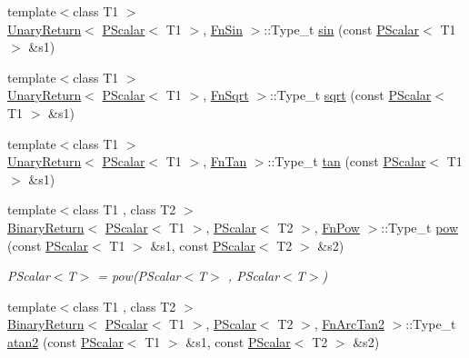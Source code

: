 \begin{DoxyCompactItemize}
\item 
{\footnotesize template$<$class T1 $>$ }\\\mbox{\hyperlink{structENSEM_1_1UnaryReturn}{Unary\+Return}}$<$ \mbox{\hyperlink{classENSEM_1_1PScalar}{P\+Scalar}}$<$ T1 $>$, \mbox{\hyperlink{structENSEM_1_1FnSin}{Fn\+Sin}} $>$\+::Type\+\_\+t \mbox{\hyperlink{group__primscalar_gaa9443eab6edf0a2d0c707614f108a8e3}{sin}} (const \mbox{\hyperlink{classENSEM_1_1PScalar}{P\+Scalar}}$<$ T1 $>$ \&s1)
\item 
{\footnotesize template$<$class T1 $>$ }\\\mbox{\hyperlink{structENSEM_1_1UnaryReturn}{Unary\+Return}}$<$ \mbox{\hyperlink{classENSEM_1_1PScalar}{P\+Scalar}}$<$ T1 $>$, \mbox{\hyperlink{structENSEM_1_1FnSqrt}{Fn\+Sqrt}} $>$\+::Type\+\_\+t \mbox{\hyperlink{group__primscalar_ga07f86503a0138d56e1948dd554ec3e10}{sqrt}} (const \mbox{\hyperlink{classENSEM_1_1PScalar}{P\+Scalar}}$<$ T1 $>$ \&s1)
\item 
{\footnotesize template$<$class T1 $>$ }\\\mbox{\hyperlink{structENSEM_1_1UnaryReturn}{Unary\+Return}}$<$ \mbox{\hyperlink{classENSEM_1_1PScalar}{P\+Scalar}}$<$ T1 $>$, \mbox{\hyperlink{structENSEM_1_1FnTan}{Fn\+Tan}} $>$\+::Type\+\_\+t \mbox{\hyperlink{group__primscalar_gac184e021b0af3d450c4db8f1a8fd75dc}{tan}} (const \mbox{\hyperlink{classENSEM_1_1PScalar}{P\+Scalar}}$<$ T1 $>$ \&s1)
\item 
{\footnotesize template$<$class T1 , class T2 $>$ }\\\mbox{\hyperlink{structENSEM_1_1BinaryReturn}{Binary\+Return}}$<$ \mbox{\hyperlink{classENSEM_1_1PScalar}{P\+Scalar}}$<$ T1 $>$, \mbox{\hyperlink{classENSEM_1_1PScalar}{P\+Scalar}}$<$ T2 $>$, \mbox{\hyperlink{structENSEM_1_1FnPow}{Fn\+Pow}} $>$\+::Type\+\_\+t \mbox{\hyperlink{group__primscalar_ga28323c8753f21f37983319d38eea45ee}{pow}} (const \mbox{\hyperlink{classENSEM_1_1PScalar}{P\+Scalar}}$<$ T1 $>$ \&s1, const \mbox{\hyperlink{classENSEM_1_1PScalar}{P\+Scalar}}$<$ T2 $>$ \&s2)
\begin{DoxyCompactList}\small\item\em P\+Scalar$<$\+T$>$ = pow(\+P\+Scalar$<$\+T$>$ , P\+Scalar$<$\+T$>$) \end{DoxyCompactList}\item 
{\footnotesize template$<$class T1 , class T2 $>$ }\\\mbox{\hyperlink{structENSEM_1_1BinaryReturn}{Binary\+Return}}$<$ \mbox{\hyperlink{classENSEM_1_1PScalar}{P\+Scalar}}$<$ T1 $>$, \mbox{\hyperlink{classENSEM_1_1PScalar}{P\+Scalar}}$<$ T2 $>$, \mbox{\hyperlink{structENSEM_1_1FnArcTan2}{Fn\+Arc\+Tan2}} $>$\+::Type\+\_\+t \mbox{\hyperlink{group__primscalar_gac0968ffacdebb29c939e8bfbfc391fd0}{atan2}} (const \mbox{\hyperlink{classENSEM_1_1PScalar}{P\+Scalar}}$<$ T1 $>$ \&s1, const \mbox{\hyperlink{classENSEM_1_1PScalar}{P\+Scalar}}$<$ T2 $>$ \&s2)

\end{DoxyCompactItemize}

